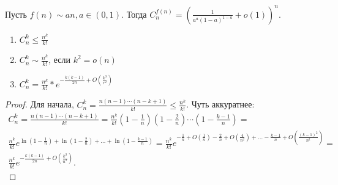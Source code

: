 \begin{exercise}
  Пусть $f(n) \sim an, a \in (0, 1)$. Тогда $C_{n}^{f(n)} = \left( \frac{1}{a^a(1-a)^{1-a}} + o(1) \right)^n$.
\end{exercise}

\begin{Th}
  \begin{enumerate}
	\item $C_{n}^{k} \le \frac{n^k}{k!}$
	\item $C_{n}^{k} \sim \frac{n^k}{k!}$, если $k^2 = o(n)$
	\item $C_{n}^{k} = \frac{n^k}{k!} * e^{-\frac{k(k-1)}{2n} + O(\frac{k^3}{r^2})}$
  \end{enumerate}
\end{Th}

\begin{proof}
  Для начала, $C_{n}^{k} = \frac{n(n-1)\cdots(n-k+1)}{k!} \le \frac{n^k}{k!}$. Чуть аккуратнее:
  \begin{multline*}
	C_{n}^{k} = \frac{n(n-1)\cdots(n-k+1)}{k!} = \frac{n^k}{k!}(1-\frac1n)(1-\frac2n)\cdots(1-\frac{k-1}{n}) = \\
	\frac{n^k}{k!}e^{\ln(1-\frac1n) + \ln(1-\frac2n) +\ldots+\ln(1-\frac{k-1}{n})} = 
	\frac{n^k}{k!}e^{-\frac1n + O(\frac1n) -\frac2n + O(\frac4{n^2}) + \ldots - \frac{k-1}{n} + O(\frac{(k-1)^2}{n^2})} = \\
	\frac{n^k}{k!}e^{-\frac{k(k-1)}{2n} + O(\frac{k^3}{n^2})}.
  \end{multline*}
\end{proof}



